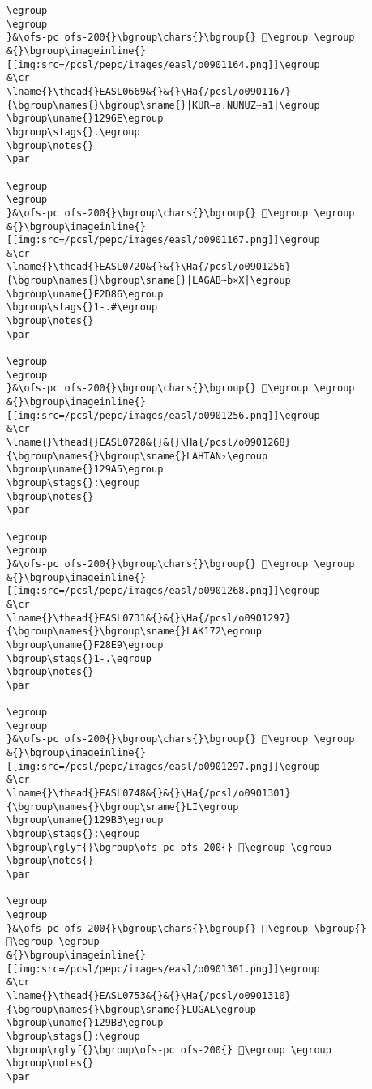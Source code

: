 \begin{verbatim}
\egroup
\egroup
}&\ofs-pc ofs-200{}\bgroup\chars{}\bgroup{} 𒥭\egroup \egroup
&{}\bgroup\imageinline{}[[img:src=/pcsl/pepc/images/easl/o0901164.png]]\egroup
&\cr
\lname{}\thead{}EASL0669&{}&{}\Ha{/pcsl/o0901167}{\bgroup\names{}\bgroup\sname{}|KUR∼a.NUNUZ∼a1|\egroup
\bgroup\uname{}1296E\egroup
\bgroup\stags{}.\egroup
\bgroup\notes{}
\par 

\egroup
\egroup
}&\ofs-pc ofs-200{}\bgroup\chars{}\bgroup{} 𒥮\egroup \egroup
&{}\bgroup\imageinline{}[[img:src=/pcsl/pepc/images/easl/o0901167.png]]\egroup
&\cr
\lname{}\thead{}EASL0720&{}&{}\Ha{/pcsl/o0901256}{\bgroup\names{}\bgroup\sname{}|LAGAB∼b×X|\egroup
\bgroup\uname{}F2D86\egroup
\bgroup\stags{}1-.#\egroup
\bgroup\notes{}
\par 

\egroup
\egroup
}&\ofs-pc ofs-200{}\bgroup\chars{}\bgroup{} 󲶆\egroup \egroup
&{}\bgroup\imageinline{}[[img:src=/pcsl/pepc/images/easl/o0901256.png]]\egroup
&\cr
\lname{}\thead{}EASL0728&{}&{}\Ha{/pcsl/o0901268}{\bgroup\names{}\bgroup\sname{}LAHTAN₂\egroup
\bgroup\uname{}129A5\egroup
\bgroup\stags{}:\egroup
\bgroup\notes{}
\par 

\egroup
\egroup
}&\ofs-pc ofs-200{}\bgroup\chars{}\bgroup{} 𒦥\egroup \egroup
&{}\bgroup\imageinline{}[[img:src=/pcsl/pepc/images/easl/o0901268.png]]\egroup
&\cr
\lname{}\thead{}EASL0731&{}&{}\Ha{/pcsl/o0901297}{\bgroup\names{}\bgroup\sname{}LAK172\egroup
\bgroup\uname{}F28E9\egroup
\bgroup\stags{}1-.\egroup
\bgroup\notes{}
\par 

\egroup
\egroup
}&\ofs-pc ofs-200{}\bgroup\chars{}\bgroup{} 󲣩\egroup \egroup
&{}\bgroup\imageinline{}[[img:src=/pcsl/pepc/images/easl/o0901297.png]]\egroup
&\cr
\lname{}\thead{}EASL0748&{}&{}\Ha{/pcsl/o0901301}{\bgroup\names{}\bgroup\sname{}LI\egroup
\bgroup\uname{}129B3\egroup
\bgroup\stags{}:\egroup
\bgroup\rglyf{}\bgroup\ofs-pc ofs-200{} 𒦳\egroup \egroup
\bgroup\notes{}
\par 

\egroup
\egroup
}&\ofs-pc ofs-200{}\bgroup\chars{}\bgroup{} 𒦳\egroup \bgroup{} 𒦴\egroup \egroup
&{}\bgroup\imageinline{}[[img:src=/pcsl/pepc/images/easl/o0901301.png]]\egroup
&\cr
\lname{}\thead{}EASL0753&{}&{}\Ha{/pcsl/o0901310}{\bgroup\names{}\bgroup\sname{}LUGAL\egroup
\bgroup\uname{}129BB\egroup
\bgroup\stags{}:\egroup
\bgroup\rglyf{}\bgroup\ofs-pc ofs-200{} 𒦻\egroup \egroup
\bgroup\notes{}
\par 


\end{verbatim}
